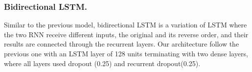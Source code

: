 \subsubsection{Bidirectional LSTM.} Similar to the previous model, bidirectional LSTM is a variation of LSTM where the two RNN receive different inputs, the original and its reverse order, and their results are connected through the recurrent layers.
Our architecture follow the previous one with an LSTM layer of 128 units terminating with two dense layers, where all layers used dropout (0.25) and recurrent dropout(0.25).

